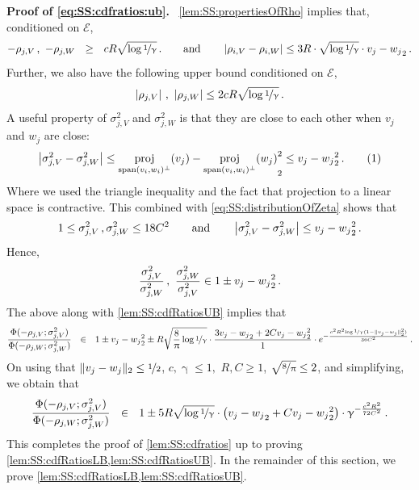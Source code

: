 \documentclass[11pt,letterpaper]{article}
\DeclareMathOperator{\proj}{proj}
\theoremstyle{plain}
\theoremstyle{definition}
\theoremstyle{remark}
\newcommand{\yesnum}{\addtocounter{equation}{1}\tag{\theequation}}
\newcommand{\qquadtext}[1]{\qquad\text{#1}\qquad}
\newcommand{\qquadand}{\qquadtext{and}}
\def\abs#1{\left| #1 \right|}
\newcommand{\sinparen}[1]{\ensuremath{(#1)}}
\newcommand{\inparen}[1]{\ensuremath{\left(#1\right)}}
\newcommand{\snorm}[1]{\ensuremath{\ensuremath{\| #1 \|}}}
\let\norm\relax
\newcommand{\norm}[1]{\ensuremath{\left\lVert #1 \right\rVert}}
\newcommand{\evE}{\ensuremath{\mathscr{E}}}
\newcommand{\nfrac}[2]{\nicefrac{#1}{#2}}
\renewcommand{\paragraph}[1]{\medskip \noindent\textbf{#1}~}
\renewcommand{\gamma}{\upgamma}
\renewcommand{\pi}{\uppi}
\newcommand{\customcdf}[2]{\Phi\sinparen{#1; \sigma_{#2}^2}}
\begin{document}
{{{            \paragraph{Proof of \cref{eq:SS:cdfratios:ub}.}
                \cref{lem:SS:propertiesOfRho} implies that, conditioned on $\evE$, 
                \[
                    -\rho_{j,V}\,,~-\rho_{j,W}
                    ~~\geq~~  c R \sqrt{\log{\nfrac{1}{\gamma}}}\,.
                    \qquadand
                    \abs{\rho_{i,V} - \rho_{i,W}} \leq 3R\cdot \sqrt{\log{\nfrac{1}{\gamma}}}\cdot \norm{v_j-w_j}_2\,.
                \]
                Further, we also have the following upper bound conditioned on $\evE$,
                \[
                    \abs{\rho_{j,V}}\,,~\abs{\rho_{j,W}}
                    \leq 2cR\sqrt{\log{\nfrac{1}{\gamma}}}\,.
                \]
                A useful property of $\sigma_{j,V}^2$ and $\sigma_{j,W}^2$ is that they are close to each other when $v_j$ and $w_j$ are close:
                \[
                    \abs{\sigma_{j,V}^2 - \sigma_{j,W}^2 }
                    \leq \norm{\proj_{{\rm span}(v_i,w_i)^\bot}(v_j) - \proj_{{\rm span}(v_i,w_i)^\bot}(w_j)}_2^2
                    \leq \norm{v_j - w_j}_2^2\,.
                    \yesnum\label{eq:SS:differenceOfVariance}
                \]
                Where we used the triangle inequality and the fact that projection to a linear space is contractive.
                This combined with  \cref{eq:SS:distributionOfZeta} shows that 
                \[
                    1\leq \sigma_{j,V}^2\,, \sigma_{j,W}^2\leq 18C^2
                    \qquadand
                    \abs{\sigma_{j,V}^2 -  \sigma_{j,W}^2}
                    \leq \norm{v_j-w_j}_2^2\,.
                \]
                Hence,
                \[
                    \frac{\sigma_{j,V}^2}{\sigma_{j,W}^2}\,,~
                    \frac{\sigma_{j,W}^2}{\sigma_{j,V}^2}
                    \in 1\pm \norm{v_j-w_j}_2^2\,.
                \]
                The above along with \cref{lem:SS:cdfRatiosUB}  implies that 
                \[
                    \frac{\customcdf{-\rho_{j,V}}{j,V}}{\customcdf{-\rho_{j,W}}{j,W}}
                        ~~\in~~
                        1\pm \norm{v_j-w_j}_2^2
                        \pm R\sqrt{\frac{8}{\pi} \log{\nfrac{1}{\gamma}}}\cdot 
                        \frac{3\norm{v_j-w_j}_2+2C\norm{v_j-w_j}_2^2}{1} \cdot e^{-\frac{c^2R^2{\log{\nfrac{1}{\gamma}}}(1-\snorm{v_j-w_j}_2^2)}{36C^2}}\,.
                \]
                On using that $\snorm{v_j-w_j}_2\leq \nfrac{1}{2}$, $c,\gamma\leq 1,$ $R,C\geq 1$, $\sqrt{\nfrac{8}{\pi}}\leq 2$, and simplifying, we obtain that 
                \[
                    \frac{\customcdf{-\rho_{j,V}}{j,V}}{\customcdf{-\rho_{j,W}}{j,W}}
                        ~~\in~~
                        1
                        \pm 5R\sqrt{\log{\nfrac{1}{\gamma}}}\cdot 
                        \inparen{\norm{v_j-w_j}_2+C\norm{v_j-w_j}_2^2}
                        \cdot \gamma^{-\frac{c^2R^2}{72C^2}}\,.
                 \]
            This completes the proof of \cref{lem:SS:cdfratios} up to proving \cref{lem:SS:cdfRatiosLB,lem:SS:cdfRatiosUB}.
            In the remainder of this section, we prove \cref{lem:SS:cdfRatiosLB,lem:SS:cdfRatiosUB}.
            
}}}
\end{document}
